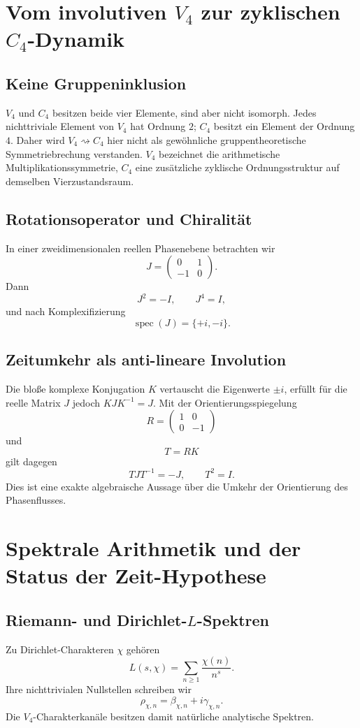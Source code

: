 \documentclass[11pt,a4paper]{article}
\begin{document}
\section{Vom involutiven $V_4$ zur zyklischen $C_4$-Dynamik}
\subsection{Keine Gruppeninklusion}
$V_4$ und $C_4$ besitzen beide vier Elemente, sind aber nicht isomorph. Jedes nichttriviale Element von $V_4$ hat Ordnung $2$; $C_4$ besitzt ein Element der Ordnung $4$. Daher wird $V_4\rightsquigarrow C_4$ hier nicht als gewöhnliche gruppentheoretische Symmetriebrechung verstanden. $V_4$ bezeichnet die arithmetische Multiplikationssymmetrie, $C_4$ eine zusätzliche zyklische Ordnungsstruktur auf demselben Vierzustandsraum.

\subsection{Rotationsoperator und Chiralität}
In einer zweidimensionalen reellen Phasenebene betrachten wir
\[
J=\begin{pmatrix}0&1\\-1&0\end{pmatrix}.
\]
Dann
\[
J^2=-I,\qquad J^4=I,
\]
und nach Komplexifizierung
\[
\operatorname{spec}(J)=\{+i,-i\}.
\]

\subsection{Zeitumkehr als anti-lineare Involution}
Die bloße komplexe Konjugation $K$ vertauscht die Eigenwerte $\pm i$, erfüllt für die reelle Matrix $J$ jedoch $KJK^{-1}=J$. Mit der Orientierungsspiegelung
\[
R=\begin{pmatrix}1&0\\0&-1\end{pmatrix}
\]
und
\[
T=RK
\]
gilt dagegen
\[
\boxed{TJT^{-1}=-J,\qquad T^2=I.}
\]
Dies ist eine exakte algebraische Aussage über die Umkehr der Orientierung des Phasenflusses.

\section{Spektrale Arithmetik und der Status der Zeit-Hypothese}
\subsection{Riemann- und Dirichlet-$L$-Spektren}
Zu Dirichlet-Charakteren $\chi$ gehören
\[
L(s,\chi)=\sum_{n\ge1}\frac{\chi(n)}{n^s}.
\]
Ihre nichttrivialen Nullstellen schreiben wir
\[
\rho_{\chi,n}=\beta_{\chi,n}+i\gamma_{\chi,n}.
\]
Die $V_4$-Charakterkanäle besitzen damit natürliche analytische Spektren.
\end{document}
